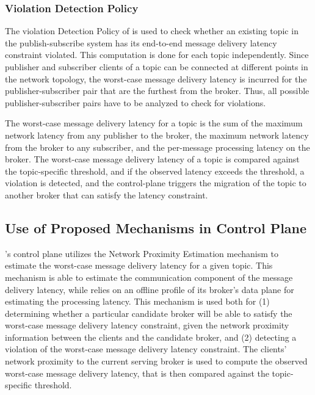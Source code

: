 \subsubsection{Violation Detection Policy}
The violation Detection Policy of \epulsar{} is used to check whether an existing topic in the publish-subscribe system has its end-to-end message delivery latency constraint violated. This computation is done for each topic independently. Since publisher and subscriber clients of a topic can be connected at different points in the network topology, the worst-case message delivery latency is incurred for the publisher-subscriber pair that are the furthest from the broker. Thus, all possible publisher-subscriber pairs have to be analyzed to check for violations.
\par The worst-case message delivery latency for a topic is the sum of the maximum network latency from any publisher to the broker, the maximum network latency from the broker to any subscriber, and the per-message processing latency on the broker. The worst-case message delivery latency of a topic is compared against the topic-specific threshold, and if the observed latency exceeds the threshold, a violation is detected, and the control-plane triggers the migration of the topic to another broker that can satisfy the latency constraint.
\subsection{Use of Proposed Mechanisms in Control Plane}
\epulsar{}'s control plane utilizes the Network Proximity Estimation mechanism to estimate the worst-case message delivery latency for a given topic. This mechanism is able to estimate the communication component of the message delivery latency, while \epulsar{} relies on an offline profile of its broker's data plane for estimating the processing latency. This mechanism is used both for (1) determining whether a particular candidate broker will be able to satisfy the worst-case message delivery latency constraint, given the network proximity information between the clients and the candidate broker, and (2) detecting a violation of the worst-case message delivery latency constraint. The clients' network proximity to the current serving broker is used to compute the observed worst-case message delivery latency, that is then compared against the topic-specific threshold.

